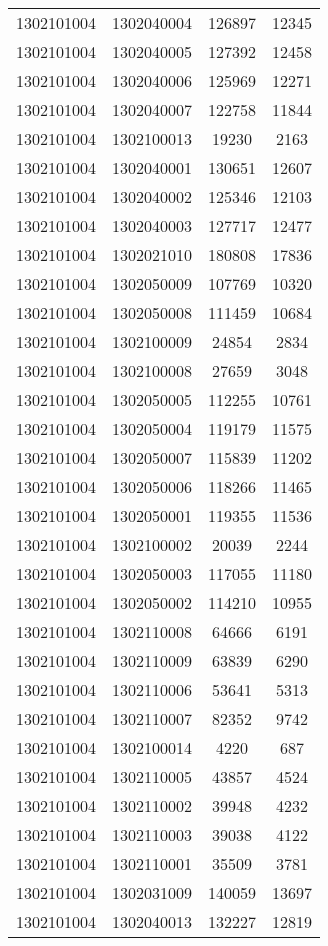 \begin{longtable}{llcc}
1302101004 & 1302040004 & 126897 & 12345\\
1302101004 & 1302040005 & 127392 & 12458\\
1302101004 & 1302040006 & 125969 & 12271\\
1302101004 & 1302040007 & 122758 & 11844\\
1302101004 & 1302100013 & 19230 & 2163\\
1302101004 & 1302040001 & 130651 & 12607\\
1302101004 & 1302040002 & 125346 & 12103\\
1302101004 & 1302040003 & 127717 & 12477\\
1302101004 & 1302021010 & 180808 & 17836\\
1302101004 & 1302050009 & 107769 & 10320\\
1302101004 & 1302050008 & 111459 & 10684\\
1302101004 & 1302100009 & 24854 & 2834\\
1302101004 & 1302100008 & 27659 & 3048\\
1302101004 & 1302050005 & 112255 & 10761\\
1302101004 & 1302050004 & 119179 & 11575\\
1302101004 & 1302050007 & 115839 & 11202\\
1302101004 & 1302050006 & 118266 & 11465\\
1302101004 & 1302050001 & 119355 & 11536\\
1302101004 & 1302100002 & 20039 & 2244\\
1302101004 & 1302050003 & 117055 & 11180\\
1302101004 & 1302050002 & 114210 & 10955\\
1302101004 & 1302110008 & 64666 & 6191\\
1302101004 & 1302110009 & 63839 & 6290\\
1302101004 & 1302110006 & 53641 & 5313\\
1302101004 & 1302110007 & 82352 & 9742\\
1302101004 & 1302100014 & 4220 & 687\\
1302101004 & 1302110005 & 43857 & 4524\\
1302101004 & 1302110002 & 39948 & 4232\\
1302101004 & 1302110003 & 39038 & 4122\\
1302101004 & 1302110001 & 35509 & 3781\\
1302101004 & 1302031009 & 140059 & 13697\\
1302101004 & 1302040013 & 132227 & 12819\\

\end{longtable}
